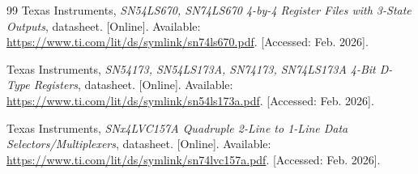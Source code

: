 \documentclass[12pt,a4paper]{report}
\begin{document}
\begin{thebibliography}{99}
Texas Instruments, \emph{SN54LS670, SN74LS670 4-by-4 Register Files with
3-State Outputs}, datasheet. [Online].
Available: \url{https://www.ti.com/lit/ds/symlink/sn74ls670.pdf}.
[Accessed: Feb. 2026].

Texas Instruments, \emph{SN54173, SN54LS173A, SN74173, SN74LS173A
4-Bit D-Type Registers}, datasheet. [Online].
Available: \url{https://www.ti.com/lit/ds/symlink/sn54ls173a.pdf}.
[Accessed: Feb. 2026].

Texas Instruments, \emph{SNx4LVC157A Quadruple 2-Line to 1-Line Data
Selectors/Multiplexers}, datasheet. [Online].
Available: \url{https://www.ti.com/lit/ds/symlink/sn74lvc157a.pdf}.
[Accessed: Feb. 2026].

\end{thebibliography}
\end{document}
